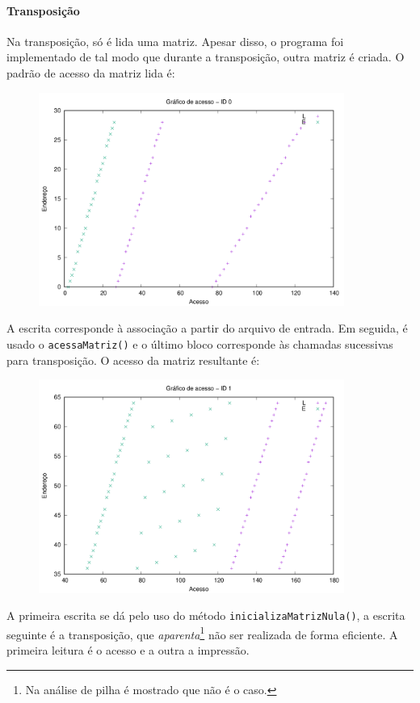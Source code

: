 \documentclass{article}
\def\code#1{\texttt{#1}}
\begin{document}
\paragraph{Transposição} Na transposição, só é lida uma matriz. Apesar disso, o programa foi implementado de tal modo que durante a transposição, outra matriz é criada. O padrão de acesso da matriz lida é:

\begin{figure} [H]
    \includegraphics[width=10cm]{t-acesso-0.png} 
    \centering
\end{figure}

A escrita corresponde à associação a partir do arquivo de entrada. Em seguida, é usado o \code{acessaMatriz()} e o último bloco corresponde às chamadas sucessivas para transposição. O acesso da matriz resultante é:

\begin{figure} [H]
    \includegraphics[width=10cm]{t-acesso-1.png} 
    \centering
\end{figure}

A primeira escrita se dá pelo uso do método \code{inicializaMatrizNula()}, a escrita seguinte é a transposição, que \textit{aparenta}\footnote{Na análise de pilha é mostrado que não é o caso.} não ser realizada de forma eficiente. A primeira leitura é o acesso e a outra a impressão.
\end{document}
